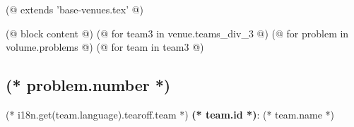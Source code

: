 (@ extends 'base-venues.tex' @)

(@ block content @)
    \pagestyle{tearoff}    
    (@ for team3 in venue.teams_div_3 @)
        (@ for problem in volume.problems @)
            (@ for team in team3 @)%
                \setcounter{volume}{(* volume.number *)}%
                \setcounter{problem}{(* problem.number *)}%
                \setcounter{team}{(* team.id *)}%

                \begin{minipage}[t][96mm][t]{\textwidth}%
                    \begin{minipage}[t][88mm][t]{0.85\linewidth}%
                        \vspace{0pt}%
                        \subsection{\texorpdfstring{(* problem.number *)}{(* problem.number *). (* problem.id *)}}%
                        \setlength{\parskip}{6pt}
                    \end{minipage}%
                    \begin{minipage}[t][88mm][t]{0.15\linewidth}
                        \vspace{0mm}%
                        \hspace{4mm}%
                        \hspace{2pt}
                    \end{minipage}
                    {\small (* i18n.get(team.language).tearoff.team *) \textbf{(* team.id *)}: (* team.name *)}
                \end{minipage}%
